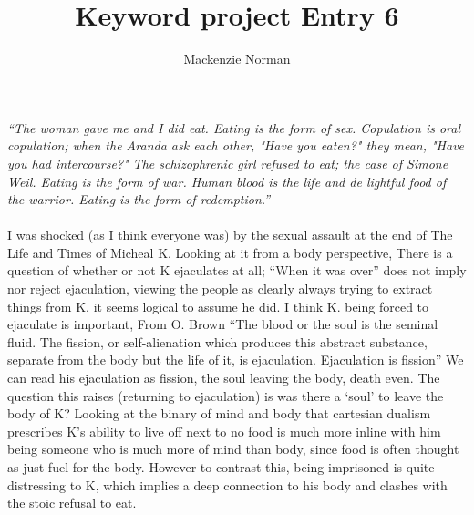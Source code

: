 \documentclass{article}
\title{Keyword project Entry 6}
\author{Mackenzie Norman}
\begin{document}
\maketitle 
\textit{``The woman gave me and I did eat. Eating is the form of sex. Copulation is oral copulation; when the Aranda ask each other, "Have you eaten?" they mean, "Have you had intercourse?" The schizophrenic girl refused to eat; the case of Simone Weil. Eating is the form of war. Human blood is the life and de lightful food of the warrior. Eating is the form of redemption.''}
\paragraph{}

I was shocked (as I think everyone was) by the sexual assault at the end of The Life and Times of Micheal K. Looking at it from a body perspective, There is a question of whether or not K ejaculates at all; ``When it was over'' does not imply nor reject ejaculation, viewing the people as clearly always trying to extract things from K. it seems logical to assume he did.  I think K. being forced to ejaculate is important, From O. Brown ``The blood or the soul is the seminal fluid. The fission, or self-alienation which produces this abstract substance, separate from the body but the life of it, is ejaculation. Ejaculation is fission'' We can read his ejaculation as fission, the soul leaving the body, death even. The question this raises (returning to ejaculation) is was there a `soul' to leave the body of K? Looking at the binary of mind and body that cartesian dualism prescribes K's ability to live off next to no food is much more inline with him being someone who is much more of mind than body, since food is often thought as just fuel for the body. However to contrast this, being imprisoned is quite distressing to K, which implies a deep connection to his body and clashes with the stoic refusal to eat.
\end{document}
